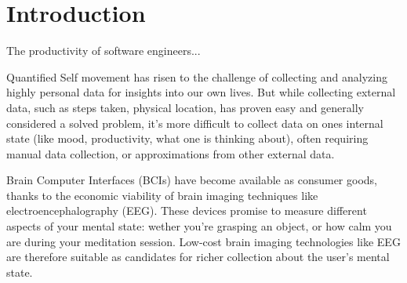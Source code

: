\section{Introduction}




The productivity of software engineers...

Quantified Self movement has risen to the challenge of collecting and analyzing highly personal data for insights into our own lives. But while collecting external data, such as steps taken, physical location, has proven easy and generally considered a solved problem, it's more difficult to collect data on ones internal state (like mood, productivity, what one is thinking about), often requiring manual data collection, or approximations from other external data.


Brain Computer Interfaces (BCIs) have become available as consumer goods, thanks to the economic viability of brain imaging techniques like electroencephalography (EEG). These devices promise to measure different aspects of your mental state: wether you're grasping an object, or how calm you are during your meditation session. Low-cost brain imaging technologies like EEG are therefore suitable as candidates for richer collection about the user's mental state.

